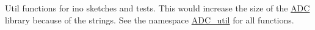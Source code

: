 Util functions for ino sketches and tests. This would increase the size of the \mbox{\hyperlink{class_a_d_c}{A\+DC}} library because of the strings. See the namespace \mbox{\hyperlink{namespace_a_d_c__util}{A\+D\+C\+\_\+util}} for all functions. 